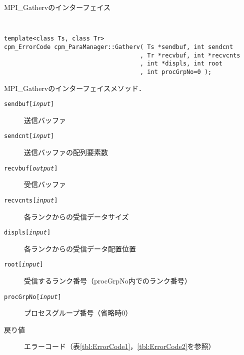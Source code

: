 \begin{spacing}{0.8}
\begin{itembox}[l]{MPI\_Gathervのインターフェイス}
{\tt
\begin{verbatim}
template<class Ts, class Tr>
cpm_ErrorCode cpm_ParaManager::Gatherv( Ts *sendbuf, int sendcnt
                                      , Tr *recvbuf, int *recvcnts
                                      , int *displs, int root
                                      , int procGrpNo=0 );
\end{verbatim}
}
MPI\_Gathervのインターフェイスメソッド．
\begin{description}
\item[{\tt sendbuf[{\it input}]}] 送信バッファ
\item[{\tt sendcnt[{\it input}]}] 送信バッファの配列要素数
\item[{\tt recvbuf[{\it output}]}] 受信バッファ
\item[{\tt recvcnts[{\it input}]}] 各ランクからの受信データサイズ
\item[{\tt displs[{\it input}]}] 各ランクからの受信データ配置位置
\item[{\tt root[{\it input}]}] 受信するランク番号（procGrpNo内でのランク番号）
\item[{\tt procGrpNo[{\it input}]}] プロセスグループ番号（省略時0）
\\
\item[戻り値] エラーコード（表\ref{tbl:ErrorCode1}，\ref{tbl:ErrorCode2}を参照）
\end{description}
\end{itembox}\\
\end{spacing}

